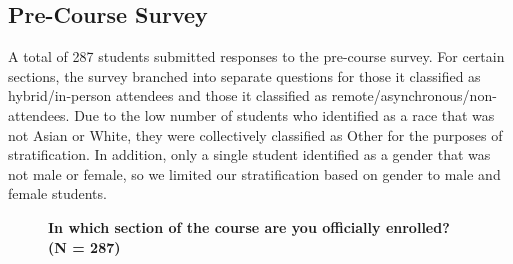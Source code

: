 \subsection{Pre-Course Survey}

A total of 287 students submitted responses to the pre-course survey. For certain sections, the survey branched into separate questions for those it classified as hybrid/in-person attendees and those it classified as remote/asynchronous/non-attendees. Due to the low number of students who identified as a race that was not Asian or White, they were collectively classified as Other for the purposes of stratification. In addition, only a single student identified as a gender that was not male or female, so we limited our stratification based on gender to male and female students.

\begin{figure}[H]
    \vspace{5mm}
    \centering
    \textbf{In which section of the course are you officially enrolled? (N = 287)}\par\medskip
    \vspace{2mm}
    \begin{subfigure}[t]{1\textwidth}
        \centering
\end{subfigure}
\end{figure}
